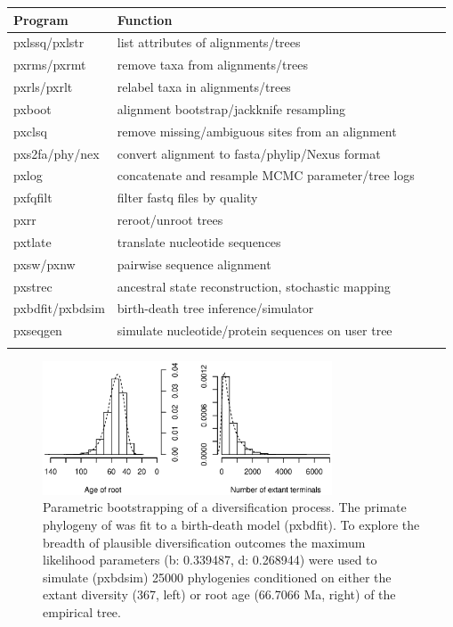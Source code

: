 \documentclass{bioinfo}
\begin{document}
\begin{methods}
\begin{table}[t]
 {\begin{tabular}{@{}llll@{}}\toprule Program &
Function\\\midrule
pxlssq/pxlstr & list attributes of alignments/trees\\
pxrms/pxrmt & remove taxa from alignments/trees\\
pxrls/pxrlt & relabel taxa in alignments/trees\\
pxboot & alignment bootstrap/jackknife resampling\\
pxclsq & remove missing/ambiguous sites from an alignment\\
pxs2fa/phy/nex & convert alignment to fasta/phylip/Nexus format\\
pxlog & concatenate and resample MCMC parameter/tree logs\\
pxfqfilt & filter fastq files by quality\\
pxrr & reroot/unroot trees\\
pxtlate &  translate nucleotide sequences\\
pxsw/pxnw & pairwise sequence alignment\\
pxstrec & ancestral state reconstruction, stochastic mapping\\
pxbdfit/pxbdsim & birth-death tree inference/simulator\\
pxseqgen & simulate nucleotide/protein sequences on user tree\\\botrule
\end{tabular}}{}
\end{table}

\begin{figure}[b]%
\centerline{\includegraphics[width=86mm]{Fig1_smallblack.eps}}
\vspace*{-5mm}
\caption{Parametric bootstrapping of a diversification process. The primate phylogeny of \cite{Springer2012} was fit to a birth-death model (pxbdfit). To explore the breadth of plausible diversification outcomes the maximum likelihood parameters (b: 0.339487, d: 0.268944) were used to simulate (pxbdsim) 25000 phylogenies conditioned on either the extant diversity (367, left) or root age (66.7066 Ma, right) of the empirical tree.}\label{fig:01}
\end{figure}


\end{methods}
\end{document}
